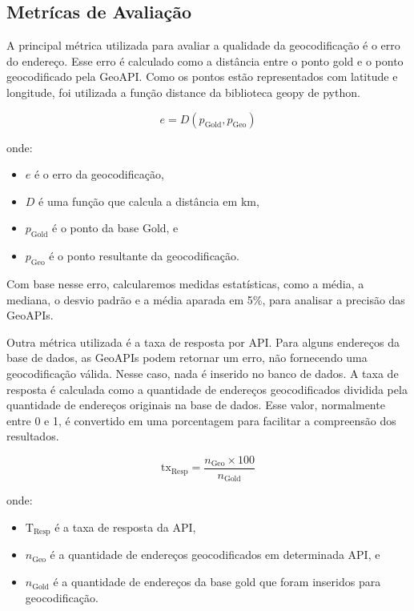 \documentclass{article}
\begin{document}
\subsection{Metrícas de Avaliação}
A principal métrica utilizada para avaliar a qualidade da geocodificação é o erro do endereço. Esse erro é calculado como a distância entre o ponto gold e o ponto geocodificado pela GeoAPI. Como os pontos estão representados com latitude e longitude, foi utilizada a função distance da biblioteca geopy de python.

\begin{equation}
  e = D(p_{\text{Gold}}, p_{\text{Geo}})
  \end{equation}
  
  onde:
  \begin{itemize}
    \item $e$ é o erro da geocodificação,
    \item $D$ é uma função que calcula a distância em km,
    \item $p_{\text{Gold}}$ é o ponto da base Gold, e
    \item $p_{\text{Geo}}$ é o ponto resultante da geocodificação.
  \end{itemize}

Com base nesse erro, calcularemos medidas estatísticas, como a média, a mediana, o desvio padrão e a média aparada em 5\%, para analisar a precisão das GeoAPIs.

Outra métrica utilizada é a taxa de resposta por API. Para alguns endereços da base de dados, as GeoAPIs podem retornar um erro, não fornecendo uma geocodificação válida. Nesse caso, nada é inserido no banco de dados. A taxa de resposta é calculada como a quantidade de endereços geocodificados dividida pela quantidade de endereços originais na base de dados. Esse valor, normalmente entre 0 e 1, é convertido em uma porcentagem para facilitar a compreensão dos resultados.

\begin{equation}
  \text{tx}_{\text{Resp}} = \frac{n_{\text{Geo}} \times 100}{n_{\text{Gold}}}
  \end{equation}
  
  onde:
  \begin{itemize}
    \item $\text{T}_{\text{Resp}}$ é a taxa de resposta da API,
    \item $n_{\text{Geo}}$ é a quantidade de endereços geocodificados em determinada API, e
    \item $n_{\text{Gold}}$ é a quantidade de endereços da base gold que foram inseridos para geocodificação.
  \end{itemize}
  
\end{document}
